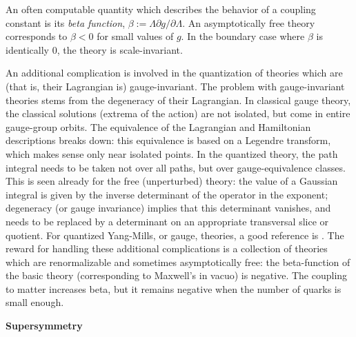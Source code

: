 An often computable quantity which describes the behavior of 
a coupling constant is its {\it beta function}, 
$\beta := \Lambda {\partial g/\partial \Lambda}$. An asymptotically 
free theory corresponds to $\beta <0$ for small values of $g$. 
In the boundary case 
where $\beta$ is identically  $0$, the theory is scale-invariant.

An additional complication is involved in the quantization
of theories which are (that is, their Lagrangian is)  
gauge-invariant. The problem with gauge-invariant theories 
stems from the degeneracy of their Lagrangian.
In classical gauge theory, the classical solutions (extrema of
the action) are not isolated, but come in entire gauge-group
orbits.
The equivalence of the Lagrangian and Hamiltonian
descriptions breaks down: this equivalence is based on a
Legendre transform, which makes sense only near isolated
points.
In the quantized theory, the path integral needs to be taken
not over all paths, but over gauge-equivalence classes.
This is seen already for the free (unperturbed) theory: the
value of a Gaussian integral is given by the inverse
determinant of the operator in the exponent; degeneracy (or
gauge invariance) implies that this determinant vanishes, and
needs to be replaced by a determinant on an appropriate
transversal slice or quotient. 
For quantized Yang-Mills, or gauge, theories, a good 
reference is \cite{FS}. The reward for handling these 
additional complications is a collection of theories which are 
renormalizable and sometimes asymptotically free: the beta-function 
of the basic theory (corresponding to Maxwell's in vacuo) is 
negative. The coupling to matter increases beta, but it remains 
negative when the number of quarks is small enough. 

\medskip\noindent
{\bf Supersymmetry}

